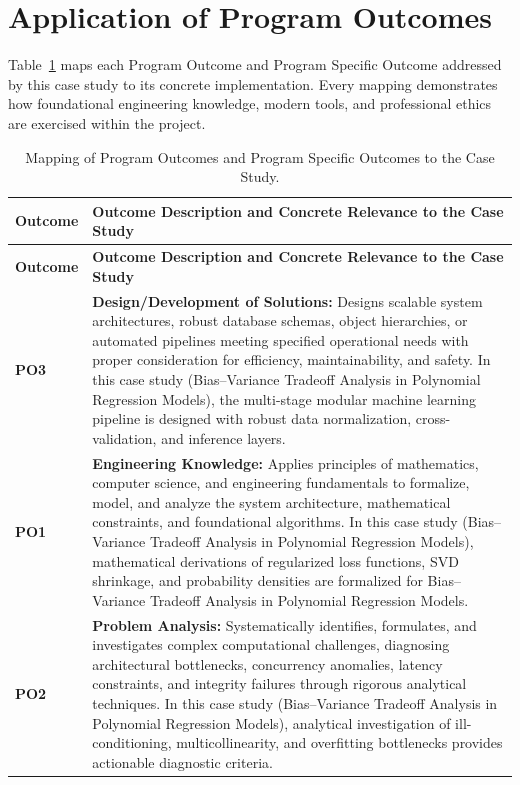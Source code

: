 \section{Application of Program Outcomes}
Table~\ref{tab:po} maps each Program Outcome and Program Specific Outcome addressed by this case study to its concrete implementation. Every mapping demonstrates how foundational engineering knowledge, modern tools, and professional ethics are exercised within the project.

{\small
\begin{longtable}{@{}>{\centering\arraybackslash}p{1.8cm} p{13.2cm}@{}}
    \caption{Mapping of Program Outcomes and Program Specific Outcomes to the Case Study.}\label{tab:po}\\
    \toprule
    \textbf{Outcome} & \textbf{Outcome Description and Concrete Relevance to the Case Study} \\
    \midrule
    \endfirsthead
    \toprule
    \textbf{Outcome} & \textbf{Outcome Description and Concrete Relevance to the Case Study} \\
    \midrule
    \endhead
\textbf{PO3} & \textbf{Design/Development of Solutions:} Designs scalable system architectures, robust database schemas, object hierarchies, or automated pipelines meeting specified operational needs with proper consideration for efficiency, maintainability, and safety. In this case study (Bias--Variance Tradeoff Analysis in Polynomial Regression Models), the multi-stage modular machine learning pipeline is designed with robust data normalization, cross-validation, and inference layers. \\
    \addlinespace
\textbf{PO1} & \textbf{Engineering Knowledge:} Applies principles of mathematics, computer science, and engineering fundamentals to formalize, model, and analyze the system architecture, mathematical constraints, and foundational algorithms. In this case study (Bias--Variance Tradeoff Analysis in Polynomial Regression Models), mathematical derivations of regularized loss functions, SVD shrinkage, and probability densities are formalized for Bias--Variance Tradeoff Analysis in Polynomial Regression Models. \\
    \addlinespace
\textbf{PO2} & \textbf{Problem Analysis:} Systematically identifies, formulates, and investigates complex computational challenges, diagnosing architectural bottlenecks, concurrency anomalies, latency constraints, and integrity failures through rigorous analytical techniques. In this case study (Bias--Variance Tradeoff Analysis in Polynomial Regression Models), analytical investigation of ill-conditioning, multicollinearity, and overfitting bottlenecks provides actionable diagnostic criteria. \\

\end{longtable}}
